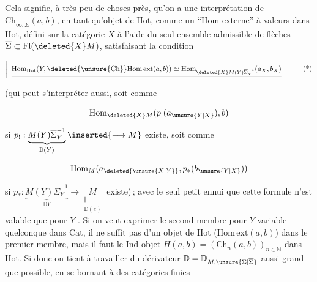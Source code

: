 
Cela signifie, à très peu de choses près, qu'on a une interprétation de $\underline{\mathrm{Ch}}_{\infty,\overline\Sigma}(a,b)$, en tant qu'objet de $\mathrm{Hot}$, comme un ``$\mathrm{Hom}$ externe''  à valeurs dans $\mathrm{Hot}$, défini sur la catégorie  $X$ à l'aide du seul ensemble admissible \deleted{\unsure{\Sigma}} de flèches $\overline\Sigma\subset\mathrm{Fl}(\deleted{X}M)$,  satisfaisant la condition

\[
\left|\enspace\underline{\mathrm{Hom}_{\mathrm{Hot}}(Y,\deleted{\unsure{\mathrm{Ch}}}\mathrm{Hom\,ext}(a,b))\simeq\mathrm{Hom}_{\deleted{X}M(Y)\overline\Sigma_Y^{-1}}(a_X,b_X)}\enspace\right|
\tag*{(*)}
\]

(qui peut s'interpréter aussi, soit comme

\[
\mathrm{Hom}_{\deleted{X}M}(p_!(a_{\unsure{Y|X}}),b)
\]

si $p_!:\underbrace{M(Y)\overline\Sigma_Y^{-1}}_{\mathbb D(Y)}\inserted{\longrightarrow M}$ existe, soit comme

\[
\mathrm{Hom}_{M}(a_{\deleted{\unsure{X|Y}}},p_*(b_{\unsure{Y|X}}))
\]

si $p_*:\underbrace{M(Y)\overline\Sigma_Y^{-1}}_{\mathbb D Y}\longrightarrow\underset{\substack{\Vert\\ \mathbb D(e)}}{M}$ existe)\,; avec le seul petit ennui que cette formule n'est valable que pour $Y$ \uline{}. Si on veut exprimer le second membre pour $Y$ variable quelconque dans $\mathrm{Cat}$, il ne suffit pas d'un objet de $\mathrm{Hot}$ ($\mathrm{Hom\,ext}(a,b)$) dans le premier membre, mais il faut le Ind-objet $H(a,b)=(\mathrm{Ch}_n(a,b))_{n\in\mathbb N}$ dans $\mathrm{Hot}$. Si donc on tient à travailler    du dérivateur $\mathbb D=\mathbb D_{M,\unsure{\Sigma|\overline\Sigma}}$ aussi grand que possible, en se bornant  à des catégories finies

